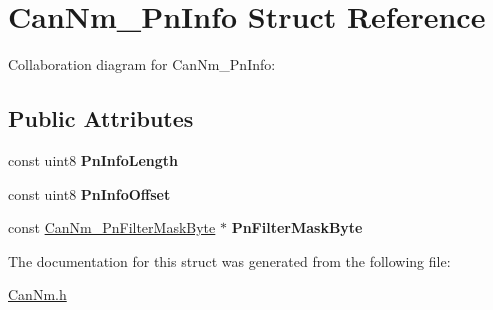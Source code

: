 \hypertarget{structCanNm__PnInfo}{}\section{Can\+Nm\+\_\+\+Pn\+Info Struct Reference}
\label{structCanNm__PnInfo}


Collaboration diagram for Can\+Nm\+\_\+\+Pn\+Info\+:
\subsection*{Public Attributes}
\begin{DoxyCompactItemize}
\item 
const uint8 {\bfseries Pn\+Info\+Length}\hypertarget{structCanNm__PnInfo_a8c2522f8651713b3b4fac7882db87f96}{}\label{structCanNm__PnInfo_a8c2522f8651713b3b4fac7882db87f96}

\item 
const uint8 {\bfseries Pn\+Info\+Offset}\hypertarget{structCanNm__PnInfo_acbc6c45e078e7f234c095ba920f936b4}{}\label{structCanNm__PnInfo_acbc6c45e078e7f234c095ba920f936b4}

\item 
const \hyperlink{structCanNm__PnFilterMaskByte}{Can\+Nm\+\_\+\+Pn\+Filter\+Mask\+Byte} $\ast$ {\bfseries Pn\+Filter\+Mask\+Byte}\hypertarget{structCanNm__PnInfo_a98a9d47357be62829c22125293b54fe6}{}\label{structCanNm__PnInfo_a98a9d47357be62829c22125293b54fe6}

\end{DoxyCompactItemize}


The documentation for this struct was generated from the following file\+:\begin{DoxyCompactItemize}
\item 
\hyperlink{CanNm_8h}{Can\+Nm.\+h}\end{DoxyCompactItemize}
